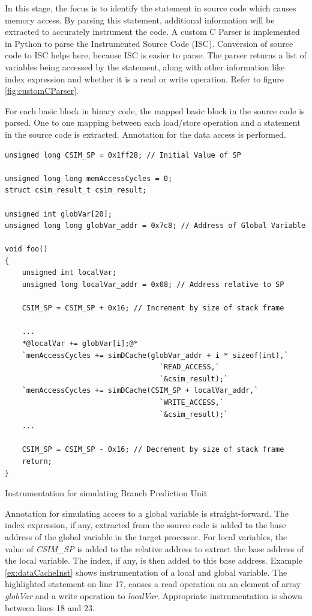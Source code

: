 In this stage, the focus is to identify the statement in source code which causes memory access. By parsing this statement, additional information will be extracted to accurately instrument the code. A custom C Parser is implemented in Python to parse the Instrumented Source Code (ISC). Conversion of source code to ISC helps here, because ISC is easier to parse. The parser returns a list of variables being accessed by the statement, along with other information like index expression and whether it is a read or write operation. Refer to figure \ref{fig:customCParser}.

For each basic block in binary code, the mapped basic block in the source code is parsed. One to one mapping between each load/store operation and a statement in the source code is extracted. Annotation for the data access is performed. 

\begin{Example}[h]
\begin{lstlisting}
unsigned long CSIM_SP = 0x1ff28; // Initial Value of SP

unsigned long long memAccessCycles = 0;
struct csim_result_t csim_result;

unsigned int globVar[20];
unsigned long long globVar_addr = 0x7c8; // Address of Global Variable

void foo()
{
    unsigned int localVar;
    unsigned long localVar_addr = 0x08; // Address relative to SP
    
    CSIM_SP = CSIM_SP + 0x16; // Increment by size of stack frame
    
    ...
    *@localVar += globVar[i];@*
    `memAccessCycles += simDCache(globVar_addr + i * sizeof(int),`
                                    `READ_ACCESS,`
                                    `&csim_result);`
    `memAccessCycles += simDCache(CSIM_SP + localVar_addr,`
                                    `WRITE_ACCESS,`
                                    `&csim_result);`
    ...
    
    CSIM_SP = CSIM_SP - 0x16; // Decrement by size of stack frame
    return;    
}        
\end{lstlisting}
\caption{Instrumentation for simulating Branch Prediction Unit}
\label{ex:dataCacheInst}
\end{Example}

Annotation for simulating access to a global variable is straight-forward. The index expression, if any, extracted from the source code is added to the base address of the global variable in the target processor. For local variables, the value of \emph{CSIM\_SP} is added to the relative address to extract the base address of the local variable. The index, if any, is then added to this base address. Example \ref{ex:dataCacheInst} shows instrumentation of a local and global variable. The highlighted statement on line 17, causes a read operation on an element of array \emph{globVar} and a write operation to \emph{localVar}. Appropriate instrumentation is shown between lines 18 and 23.

